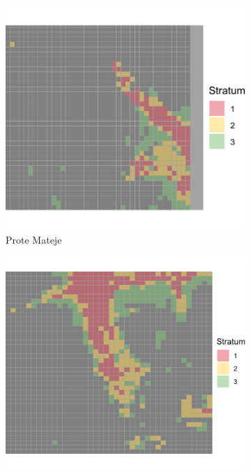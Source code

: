 \documentclass[a4paper,12pt]{article}
\begin{document}
\begin{figure}[H]
	\centering
  
	\begin{subfigure}[b]{0.3\textwidth}
	  \centering
	  \includegraphics[width=\textwidth]{../grid_output/strata_viz/prote-mateje_strata.png}
	  \caption{Prote Mateje}
	  \label{fig:prote-mateje}
	\end{subfigure}
	\hfill
	\begin{subfigure}[b]{0.3\textwidth}
	  \centering
	  \includegraphics[width=\textwidth]{../grid_output/strata_viz/nemanjina_strata.png}

\end{subfigure}
\end{figure}
\end{document}
